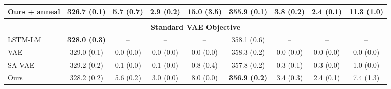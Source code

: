 \documentclass{article} \usepackage{iclr2019_conference,times}
\begin{document}
\begin{table}[!t]
{\begin{tabular}{lcccc|cccc}
    Ours + anneal               &\textbf{326.7 (0.1)}  &5.7 (0.7)   &2.9 (0.2)  &15.0 (3.5) &\textbf{355.9 (0.1)}  &3.8 (0.2)     &2.4 (0.1)  & 11.3 (1.0) \\
    \midrule
    \vspace{-9pt} \\
    \multicolumn{9}{c}{\bf Standard VAE Objective} \vspace{3pt} \\
    LSTM-LM              &\textbf{328.0 (0.3)}                 &--    &--   &-- &358.1 (0.6)           &--      &--   &-- \\
    VAE                         &329.0 (0.1)   &0.0 (0.0)   &0.0 (0.0) &0.0 (0.0)   &358.3 (0.2)          &0.0 (0.0)     &0.0 (0.0)   &0.0 (0.0)\\
    SA-VAE                      &329.2 (0.2)  &0.1 (0.0)   &0.1 (0.0) &0.8 (0.4)  &357.8 (0.2)   &0.3 (0.1)     &0.3 (0.0) &1.0 (0.0) \\
    Ours                        &328.2 (0.2)        &5.6 (0.2)   &3.0 (0.0) &8.0 (0.0)  &\textbf{356.9 (0.2)}  &3.4 (0.3)  &2.4 (0.1) &7.4 (1.3)  \\    
    \bottomrule
    \end{tabular}}
\end{table}
\end{document}
